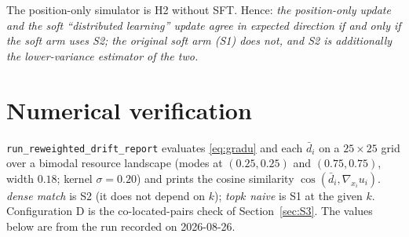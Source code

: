 \documentclass[11pt]{article}
\theoremstyle{remark}
\begin{document}
The position-only simulator is H2 without SFT. Hence: \emph{the position-only
update and the soft ``distributed learning'' update agree in expected
direction if and only if the soft arm uses S2; the original soft arm (S1)
does not, and S2 is additionally the lower-variance estimator of the two.}

\section{Numerical verification}
\label{sec:num}

\texttt{run\_reweighted\_drift\_report} evaluates \eqref{eq:gradu} and each
$\bar d_i$ on a $25\times25$ grid over a bimodal resource landscape (modes at
$(0.25,0.25)$ and $(0.75,0.75)$, width $0.18$; kernel $\sigma=0.20$) and
prints the cosine similarity $\cos(\bar d_i,\nabla_{x_i}u_i)$. \emph{dense
match} is S2 (it does not depend on $k$); \emph{top$k$ naive} is S1 at the
given $k$. Configuration D is the co-located-pairs check of
Section~\ref{sec:S3}. The values below are from the run recorded on
2026-08-26.
\end{document}
